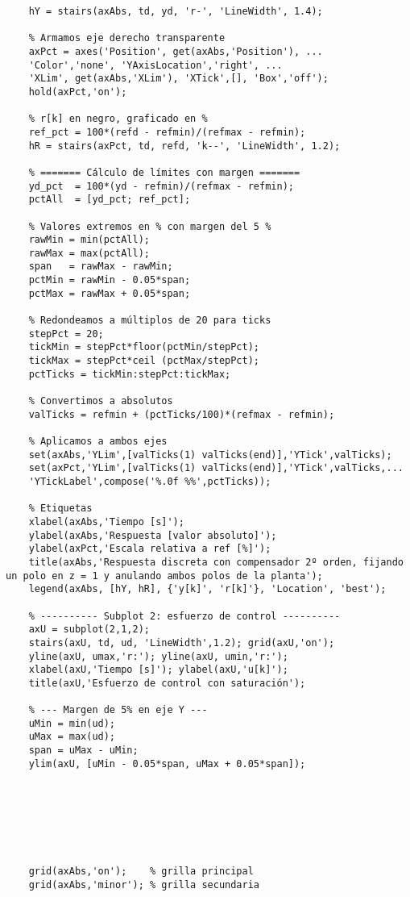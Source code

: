 \begin{lstlisting}[style=matlabstyle,caption={Segunda hoja de cálculos utilizada.},label={matlab:calculo2}]
	% y[k] en rojo (abs)
	hY = stairs(axAbs, td, yd, 'r-', 'LineWidth', 1.4);
	
	% Armamos eje derecho transparente
	axPct = axes('Position', get(axAbs,'Position'), ...
	'Color','none', 'YAxisLocation','right', ...
	'XLim', get(axAbs,'XLim'), 'XTick',[], 'Box','off');
	hold(axPct,'on');
	
	% r[k] en negro, graficado en %
	ref_pct = 100*(refd - refmin)/(refmax - refmin);
	hR = stairs(axPct, td, refd, 'k--', 'LineWidth', 1.2);
	
	% ======= Cálculo de límites con margen =======
	yd_pct  = 100*(yd - refmin)/(refmax - refmin);
	pctAll  = [yd_pct; ref_pct];
	
	% Valores extremos en % con margen del 5 %
	rawMin = min(pctAll);
	rawMax = max(pctAll);
	span   = rawMax - rawMin;
	pctMin = rawMin - 0.05*span;
	pctMax = rawMax + 0.05*span;
	
	% Redondeamos a múltiplos de 20 para ticks
	stepPct = 20;
	tickMin = stepPct*floor(pctMin/stepPct);
	tickMax = stepPct*ceil (pctMax/stepPct);
	pctTicks = tickMin:stepPct:tickMax;
	
	% Convertimos a absolutos
	valTicks = refmin + (pctTicks/100)*(refmax - refmin);
	
	% Aplicamos a ambos ejes
	set(axAbs,'YLim',[valTicks(1) valTicks(end)],'YTick',valTicks);
	set(axPct,'YLim',[valTicks(1) valTicks(end)],'YTick',valTicks,...
	'YTickLabel',compose('%.0f %%',pctTicks));
	
	% Etiquetas
	xlabel(axAbs,'Tiempo [s]');
	ylabel(axAbs,'Respuesta [valor absoluto]');
	ylabel(axPct,'Escala relativa a ref [%]');
	title(axAbs,'Respuesta discreta con compensador 2º orden, fijando un polo en z = 1 y anulando ambos polos de la planta');
	legend(axAbs, [hY, hR], {'y[k]', 'r[k]'}, 'Location', 'best');
	
	% ---------- Subplot 2: esfuerzo de control ----------
	axU = subplot(2,1,2);
	stairs(axU, td, ud, 'LineWidth',1.2); grid(axU,'on');
	yline(axU, umax,'r:'); yline(axU, umin,'r:');
	xlabel(axU,'Tiempo [s]'); ylabel(axU,'u[k]');
	title(axU,'Esfuerzo de control con saturación');
	
	% --- Margen de 5% en eje Y ---
	uMin = min(ud);
	uMax = max(ud);
	span = uMax - uMin;
	ylim(axU, [uMin - 0.05*span, uMax + 0.05*span]);
	
	
	
	
	
	
	
	grid(axAbs,'on');    % grilla principal
	grid(axAbs,'minor'); % grilla secundaria
	

\end{lstlisting}

